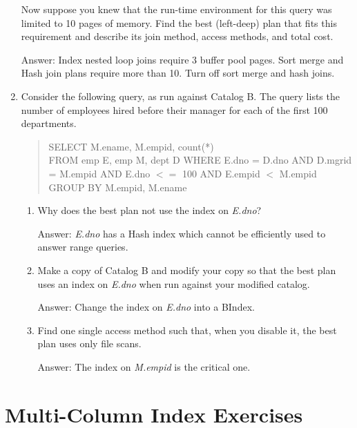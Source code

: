\begin{enumerate}
Now suppose you knew that the run-time environment for this query was
limited to 10 pages of memory.  Find the best (left-deep) plan that
fits this requirement and describe its join method, access methods, and
total cost.

Answer: Index nested loop joins require 3 buffer pool pages.  Sort merge
and Hash join plans require more than 10.  Turn off sort merge and
hash joins.


\item

Consider the following query, as run against Catalog B.  The query lists
the number of employees hired before their manager for each of the first
100 departments.

\begin{quote}
	SELECT M.ename, M.empid, count(*)\\
	FROM emp E, emp M, dept D
	WHERE E.dno = D.dno AND D.mgrid = M.empid
		AND E.dno $<=$ 100 AND E.empid $<$ M.empid
	GROUP BY M.empid, M.ename
\end{quote}
\begin{enumerate}
\item
Why does the best plan not use the index on {\em E.dno}?

Answer: {\em E.dno} has a Hash index which cannot be efficiently used
to answer range queries.

\item
Make a copy of Catalog B and modify your copy so that the best plan
uses an index on {\em E.dno} when run against your modified catalog.

Answer: Change the index on {\em E.dno} into a BIndex.

\item
Find one single access method such that, when you disable it, the best
plan uses only file scans.

Answer: The index on {\em M.empid} is the critical one.

\end{enumerate}

\end{enumerate}

\section{Multi-Column Index Exercises}

